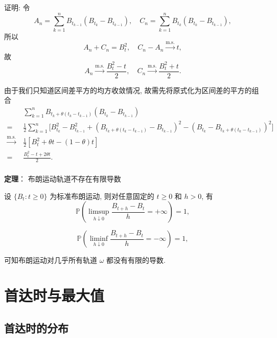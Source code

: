 \documentclass[openany]{ctexbook}
\theoremstyle{kaiti}
\theoremstyle{normal}
\begin{document}
证明: 
令
\begin{equation}
  A_n=\sum_{k=1}^nB_{t_{k-1}}(B_{t_k}-B_{t_{k-1}}),\quad C_n=\sum_{k=1}^nB_{t_{k}}(B_{t_k}-B_{t_{k-1}}),
\end{equation}
所以
\begin{equation}
  A_n+C_n=B_t^2,\quad C_n-A_n\overset{\text{m.s.}}{\to}t,
\end{equation}
故
\begin{equation}
  A_n\overset{\text{m.s.}}{\to}\frac{B_t^2-t}{2},\quad C_n\overset{\text{m.s.}}{\to}\frac{B_t^2+t}{2}.
\end{equation}

由于我们只知道区间差平方的均方收敛情况, 故需先将原式化为区间差的平方的组合
\begin{equation}
  \begin{aligned}
  &\sum_{k=1}^nB_{t_{k}+\theta(t_k-t_{k-1})}(B_{t_k}-B_{t_{k-1}})\\
  =~&\frac{1}{2}\sum_{k=1}^n\Big[B_{t_k}^2-B_{t_{k-1}}^2+(B_{t_{k}+\theta(t_k-t_{k-1})}-B_{t_{k-1}})^2-(B_{t_k}-B_{t_{k}+\theta(t_k-t_{k-1})})^2\Big]\\
  \overset{\text{m.s.}}{\to}~&\frac{1}{2}[B_t^2+\theta t-(1-\theta)t]\\
  =~&\frac{B_t^2-t+2\theta t}{2}.\\
  \end{aligned}
\end{equation}

\textbf{定理}： 布朗运动轨道不存在有限导数

设 $\{B_t:t\geqslant0\}$ 为标准布朗运动, 则对任意固定的 $t\geqslant0$ 和 $h>0$, 有
\begin{equation}
  \mathbb{P}\left(\limsup_{h\downarrow0}\frac{B_{t+h}-B_t}{h}=+\infty\right)=1,
\end{equation}

\begin{equation}
  \mathbb{P}\left(\liminf_{h\downarrow0}\frac{B_{t+h}-B_t}{h}=-\infty\right)=1,
\end{equation}

可知布朗运动对几乎所有轨道 $\omega$ 都没有有限的导数.

\section{首达时与最大值}

\subsection{首达时的分布}
\end{document}
